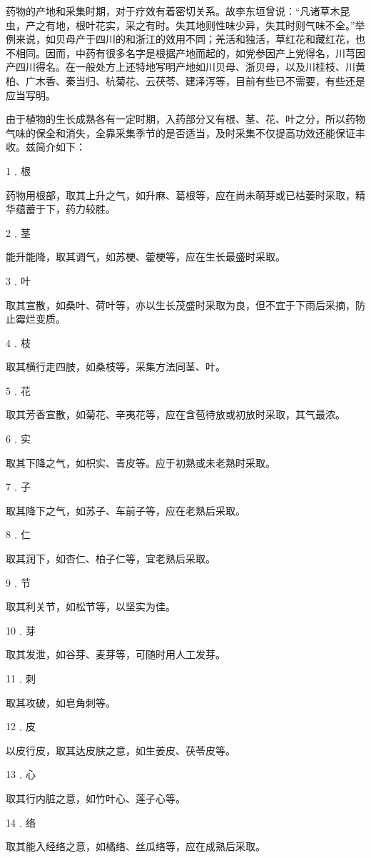 \documentclass[a4paper,12pt,UTF8,twoside]{ctexbook}
\begin{document}
药物的产地和采集时期，对于疗效有着密切关系。故李东垣曾说：“凡诸草木昆虫，产之有地，根叶花实，采之有时。失其地则性味少异，失其时则气味不全。”举例来说，如贝母产于四川的和浙江的效用不同；羌活和独活，草红花和藏红花，也不相同。因而，中药有很多名字是根据产地而起的，如党参因产上党得名，川芎因产四川得名。在一般处方上还特地写明产地如川贝母、浙贝母，以及川桂枝、川黄柏、广木香、秦当归、杭菊花、云茯苓、建泽泻等，目前有些已不需要，有些还是应当写明。

由于植物的生长成熟各有一定时期，入药部分又有根、茎、花、叶之分，所以药物气味的保全和消失，全靠采集季节的是否适当，及时采集不仅提高功效还能保证丰收。兹简介如下：

1﹒根

药物用根部，取其上升之气，如升麻、葛根等，应在尚未萌芽或已枯萎时采取，精华蕴蓄于下，药力较胜。

2﹒茎

能升能降，取其调气，如苏梗、藿梗等，应在生长最盛时采取。

3﹒叶

取其宣散，如桑叶、荷叶等，亦以生长茂盛时采取为良，但不宜于下雨后采摘，防止霉烂变质。

4﹒枝

取其横行走四肢，如桑枝等，采集方法同茎、叶。

5﹒花

取其芳香宣散，如菊花、辛夷花等，应在含苞待放或初放时采取，其气最浓。

6﹒实

取其下降之气，如枳实、青皮等。应于初熟或未老熟时采取。

7﹒子

取其降下之气，如苏子、车前子等，应在老熟后采取。

8﹒仁

取其润下，如杏仁、柏子仁等，宜老熟后采取。

9﹒节

取其利关节，如松节等，以坚实为佳。

10﹒芽

取其发泄，如谷芽、麦芽等，可随时用人工发芽。

11﹒刺

取其攻破，如皂角刺等。

12﹒皮

以皮行皮，取其达皮肤之意，如生姜皮、茯苓皮等。

13﹒心

取其行内脏之意，如竹叶心、莲子心等。

14﹒络

取其能入经络之意，如橘络、丝瓜络等，应在成熟后采取。
\end{document}

